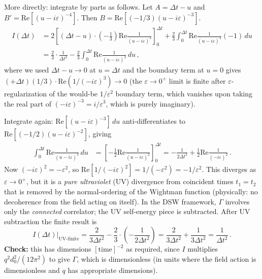\documentclass[12pt]{article}
\newcommand{\lb}{\left}
\newcommand{\rb}{\right}
\begin{document}
More directly: integrate by parts as follows.  Let
$A = \Delta t - u$ and $B' = \mathrm{Re}[(u-i\varepsilon)^{-4}]$.
Then $B = \mathrm{Re}[(-1/3)(u-i\varepsilon)^{-3}]$.
%
\begin{align}
  I(\Delta t)
  &=
  2\lb[(\Delta t - u)\cdot\lb(-\frac{1}{3}\rb)\mathrm{Re}\frac{1}{(u-i\varepsilon)^{3}}\rb]_{0}^{\Delta t}
  +
  \frac{2}{3}\int_{0}^{\Delta t}\mathrm{Re}\frac{1}{(u-i\varepsilon)^{3}}(-1)\,du \nonumber\\
  &=
  \frac{2}{3}\cdot\frac{1}{\Delta t^{2}}
  -
  \frac{2}{3}\int_{0}^{\Delta t}\mathrm{Re}\frac{1}{(u-i\varepsilon)^{3}}\,du \,,
\end{align}
%
where we used $\Delta t - u\to 0$ at $u=\Delta t$ and the boundary term at $u=0$
gives $(+\Delta t)(1/3)\cdot \mathrm{Re}(1/(-i\varepsilon)^{3}) \to 0$ (the
$\varepsilon\to 0^{+}$ limit is finite after $\varepsilon$-regularization of the
would-be $1/\varepsilon^{2}$ boundary term, which vanishes upon taking the real
part of $(-i\varepsilon)^{-3} = i/\varepsilon^{3}$, which is purely imaginary).

Integrate again: $\mathrm{Re}[(u-i\varepsilon)^{-3}]\,du$ anti-differentiates to
$\mathrm{Re}[(-1/2)(u-i\varepsilon)^{-2}]$, giving
%
\begin{align}
  \int_{0}^{\Delta t}\mathrm{Re}\frac{1}{(u-i\varepsilon)^{3}}\,du
  &=
  \lb[-\frac{1}{2}\mathrm{Re}\frac{1}{(u-i\varepsilon)^{2}}\rb]_{0}^{\Delta t}
  =
  -\frac{1}{2\Delta t^{2}} + \frac{1}{2}\mathrm{Re}\frac{1}{(-i\varepsilon)^{2}} \,.
\end{align}
%
Now $(-i\varepsilon)^{2} = -\varepsilon^{2}$, so $\mathrm{Re}[1/(-i\varepsilon)^{2}] =
1/(-\varepsilon^{2}) = -1/\varepsilon^{2}$.
This diverges as $\varepsilon\to 0^{+}$, but it is a \emph{pure ultraviolet} (UV)
divergence from coincident times $t_{1}=t_{2}$ that is removed by the normal-ordering
of the Wightman function (physically: no decoherence from the field acting on itself).
In the DSW framework, $\Gamma$ involves only the \emph{connected} correlator;
the UV self-energy piece is subtracted.  After UV subtraction the finite result is
%
\begin{equation}
  I(\Delta t)\big|_{\text{UV-finite}}
  =
  \frac{2}{3\Delta t^{2}}
  -
  \frac{2}{3}\cdot\lb(-\frac{1}{2\Delta t^{2}}\rb)
  =
  \frac{2}{3\Delta t^{2}} + \frac{1}{3\Delta t^{2}}
  =
  \frac{1}{\Delta t^{2}} \,.
  \label{eq:I-result}
\end{equation}
%
\textbf{Check:} this has dimensions $[\text{time}]^{-2}$ as required, since $I$ multiplies
$q^{2}d_{0}^{2}/(12\pi^{2})$ to give $\Gamma$, which is dimensionless (in units where
the field action is dimensionless and $q$ has appropriate dimensions).
\end{document}
